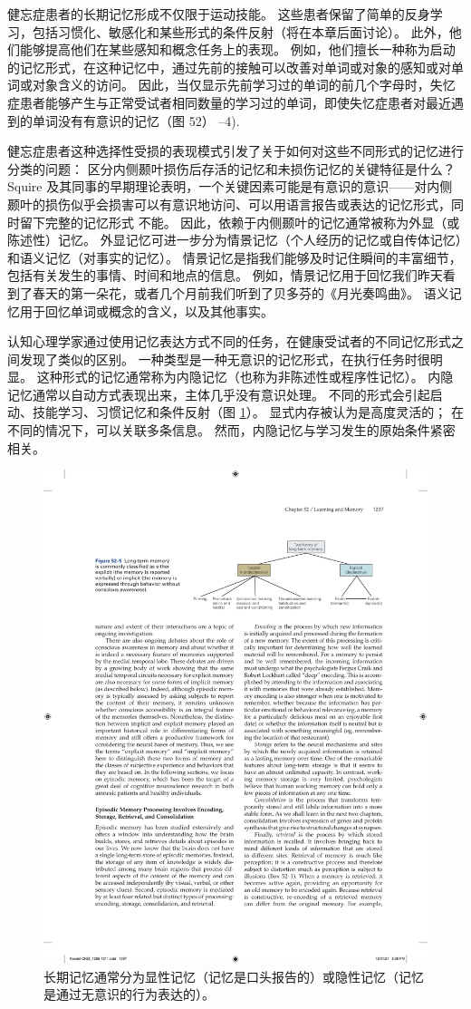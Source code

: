 健忘症患者的长期记忆形成不仅限于运动技能。
这些患者保留了简单的反身学习，包括习惯化、敏感化和某些形式的条件反射（将在本章后面讨论）。
此外，他们能够提高他们在某些感知和概念任务上的表现。
例如，他们擅长一种称为启动的记忆形式，在这种记忆中，通过先前的接触可以改善对单词或对象的感知或对单词或对象含义的访问。
因此，当仅显示先前学习过的单词的前几个字母时，失忆症患者能够产生与正常受试者相同数量的学习过的单词，即使失忆症患者对最近遇到的单词没有有意识的记忆（图 52） –4).


健忘症患者这种选择性受损的表现模式引发了关于如何对这些不同形式的记忆进行分类的问题：
区分内侧颞叶损伤后存活的记忆和未损伤记忆的关键特征是什么？
Squire 及其同事的早期理论表明，一个关键因素可能是有意识的意识——对内侧颞叶的损伤似乎会损害可以有意识地访问、可以用语言报告或表达的记忆形式，同时留下完整的记忆形式 不能。
因此，依赖于内侧颞叶的记忆通常被称为外显（或陈述性）记忆。
外显记忆可进一步分为情景记忆（个人经历的记忆或自传体记忆）和语义记忆（对事实的记忆）。
情景记忆是指我们能够及时记住瞬间的丰富细节，包括有关发生的事情、时间和地点的信息。
例如，情景记忆用于回忆我们昨天看到了春天的第一朵花，或者几个月前我们听到了贝多芬的《月光奏鸣曲》。
语义记忆用于回忆单词或概念的含义，以及其他事实。


认知心理学家通过使用记忆表达方式不同的任务，在健康受试者的不同记忆形式之间发现了类似的区别。
一种类型是一种无意识的记忆形式，在执行任务时很明显。
这种形式的记忆通常称为内隐记忆（也称为非陈述性或程序性记忆）。
内隐记忆通常以自动方式表现出来，主体几乎没有意识处理。
不同的形式会引起启动、技能学习、习惯记忆和条件反射（图 \ref{fig:52_5}）。
显式内存被认为是高度灵活的；
在不同的情况下，可以关联多条信息。
然而，内隐记忆与学习发生的原始条件紧密相关。


\begin{figure}[htbp]
	\centering
	\includegraphics[width=0.7\linewidth]{chap52/fig_52_5}
	\caption{长期记忆通常分为显性记忆（记忆是口头报告的）或隐性记忆（记忆是通过无意识的行为表达的）。}
	\label{fig:52_5}
\end{figure}

